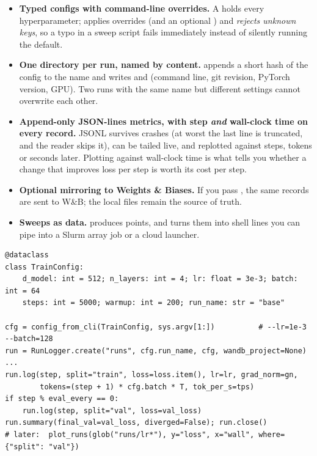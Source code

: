 \begin{itemize}
  \item \textbf{Typed configs with command-line overrides.} A  holds every
        hyperparameter;  applies
         overrides (and an optional ) and \emph{rejects
        unknown keys}, so a typo in a sweep script fails immediately instead of silently running the
        default.
  \item \textbf{One directory per run, named by content.} 
        appends a short hash of the config to the name and writes  and
         (command line, git revision, PyTorch version, GPU). Two runs with the same
        name but different settings cannot overwrite each other.
  \item \textbf{Append-only JSON-lines metrics, with step \emph{and} wall-clock time on every
        record.} JSONL survives crashes (at worst the last line is truncated, and the reader skips
        it), can be tailed live, and replotted against steps, tokens or seconds later. Plotting
        against wall-clock time is what tells you whether a change that improves loss per step is
        worth its cost per step.
  \item \textbf{Optional mirroring to Weights \& Biases.} If you pass , the
        same records are sent to W\&B; the local files remain the source of truth.
  \item \textbf{Sweeps as data.} 
        produces points, and  turns them into shell lines you can pipe
        into a Slurm array job or a cloud launcher.
\end{itemize}

\begin{lstlisting}[caption={A training script's experiment plumbing.},label={lst:optim:explog}]
@dataclass
class TrainConfig:
    d_model: int = 512; n_layers: int = 4; lr: float = 3e-3; batch: int = 64
    steps: int = 5000; warmup: int = 200; run_name: str = "base"

cfg = config_from_cli(TrainConfig, sys.argv[1:])          # --lr=1e-3 --batch=128
run = RunLogger.create("runs", cfg.run_name, cfg, wandb_project=None)
...
run.log(step, split="train", loss=loss.item(), lr=lr, grad_norm=gn,
        tokens=(step + 1) * cfg.batch * T, tok_per_s=tps)
if step % eval_every == 0:
    run.log(step, split="val", loss=val_loss)
run.summary(final_val=val_loss, diverged=False); run.close()
# later:  plot_runs(glob("runs/lr*"), y="loss", x="wall", where={"split": "val"})
\end{lstlisting}

